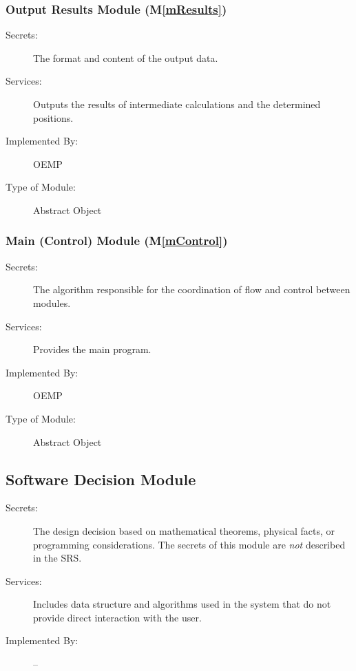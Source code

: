 \documentclass[12pt, titlepage]{article}
\newcommand{\mref}[1]{M\ref{#1}}
\begin{document}
\subsubsection{Output Results Module (\mref{mResults})}
\begin{description}
  \item[Secrets:]The format and content of the output data.
  \item[Services:]Outputs the results of intermediate calculations and the determined positions. 
  \item[Implemented By:] OEMP
  \item[Type of Module:] Abstract Object
\end{description}

\subsubsection{Main (Control) Module (\mref{mControl})}
\begin{description}
  \item[Secrets:]The algorithm responsible for the coordination of flow and control between modules.
  \item[Services:]Provides the main program. 
  \item[Implemented By:] OEMP
  \item[Type of Module:] Abstract Object
\end{description}

\subsection{Software Decision Module}

\begin{description}
\item[Secrets:] The design decision based on mathematical theorems, physical
  facts, or programming considerations. The secrets of this module are
  \emph{not} described in the SRS.
\item[Services:] Includes data structure and algorithms used in the system that
  do not provide direct interaction with the user. 
\item[Implemented By:] --
\end{description}
\end{document}
